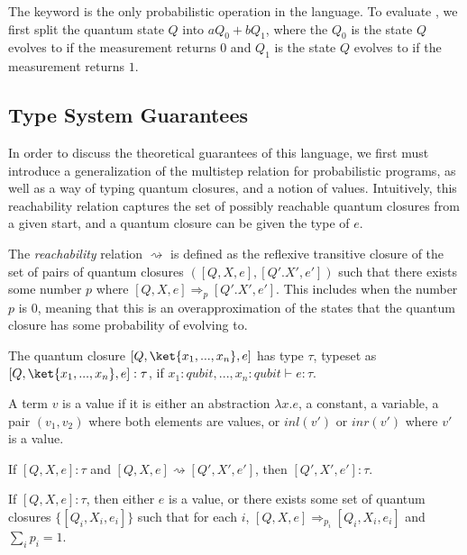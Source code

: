 The  keyword is the only probabilistic operation in the language.
To evaluate , we first split the quantum state $Q$ into $aQ_0 + bQ_1$, where the $Q_0$ is the state $Q$ evolves to if the measurement returns $0$ and $Q_1$ is the state $Q$ evolves to if the measurement returns $1$.

\subsection{Type System Guarantees}
In order to discuss the theoretical guarantees of this language, we first must introduce a generalization of the multistep relation for probabilistic programs, as well as a way of typing quantum closures, and a notion of values.
Intuitively, this reachability relation captures the set of possibly reachable quantum closures from a given start, and a quantum closure can be given the type of $e$.
\begin{definition}
The \textit{reachability} relation $\rightsquigarrow$ is defined as the reflexive transitive closure of the set of pairs of quantum closures $([Q,X,e], [Q'.X',e'])$ such that there exists some number $p$ where $[Q,X,e]\Rightarrow_p [Q'.X',e']$.
This includes when the number $p$ is 0, meaning that this is an overapproximation of the states that the quantum closure has some probability of evolving to.
\end{definition}
\begin{definition}
    The quantum closure $[Q, \ket{x_1,...,x_n}, e]$ has type $\tau$, typeset as $[Q, \ket{x_1,...,x_n}, e]:\tau$, if $x_1 : qubit, ..., x_n : qubit \vdash e : \tau$.
\end{definition}
\begin{definition}
    A term $v$ is a value if it is either an abstraction $\lambda x. e$, a constant, a variable, a pair $(v_1,v_2)$ where both elements are values, or $inl(v')$ or $inr(v')$  where $v'$ is a value.
\end{definition}
\begin{theorem}[Preservation]
    If $[Q,X,e] : \tau$ and $[Q,X,e] \rightsquigarrow [Q',X',e']$, then $[Q',X',e'] : \tau$.
\end{theorem}
\begin{theorem}[Progress]
    If $[Q,X,e] : \tau$, then either $e$ is a value, or there exists some set of quantum closures $\{[Q_i,X_i,e_i]\}$ such that for each $i$, $[Q,X,e]\Rightarrow_{p_i}[Q_i,X_i,e_i]$ and $\sum_{i}p_i=1$.
\end{theorem}